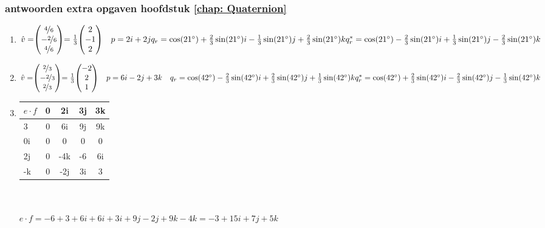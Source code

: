 \subsubsection{antwoorden extra opgaven hoofdstuk \ref{chap: Quaternion}}
\begin{enumerate}
	\item 
	$\hat{v} = \vecdrie{\nicefrac{4}{6}}{-\nicefrac{2}{6}}{\nicefrac{4}{6}} = \frac{1}{3}\vecdrie{2}{-1}{2}
	\quad p  = 2i + 2j\\
	q_r   =  \cos(21 \degree)  + \frac{2}{3}\sin(21 \degree) i - \frac{1}{3}\sin(21 \degree) j + \frac{2}{3} \sin(21 \degree) k   \\
	q^*_r =  \cos(21 \degree)  - \frac{2}{3}\sin(21 \degree) i + \frac{1}{3}\sin(21 \degree) j - \frac{2}{3} \sin(21 \degree) k $ \\
	
	\item 
	$\hat{v} = \vecdrie{\nicefrac{2}{3}}{- \nicefrac{2}{3}}{\nicefrac{2}{3}} = \frac{1}{3}\vecdrie{-2}{2}{1}
	\quad p  = 6i - 2j + 3k     \\
    \quad q_r  =  \cos(42 \degree)  - \frac{2}{3}\sin(42 \degree) i + \frac{2}{3}\sin(42 \degree) j + \frac{1}{3}\sin(42 \degree) k \\
	q^*_r      =  \cos(42 \degree)  + \frac{2}{3}\sin(42 \degree) i	- \frac{2}{3}\sin(42 \degree) j - \frac{1}{3}\sin(42 \degree) k $ \\
		
	\item
	\begin{tabular}{ | l || c | c |c |c |}
		\hline
		$ e\cdot f $ & 0 & 2i  & 3j       & 3k \\ \hline \hline
		3          & 0 & 6i   &   9j    & 9k  \\ \hline
		0i         & 0 & 0   &   0    & 0 \\ \hline
		2j         & 0 &  -4k  &   -6     & 6i\\ \hline
		-k         & 0  & -2j  & 3i      & 3\\ 
		\hline 
	\end{tabular} \\ \\
	$ e\cdot f = -6+3+6i+6i+3i+9j-2j+9k-4k = -3 +15i + 7j + 5k $\\ \\
	

\end{enumerate}
